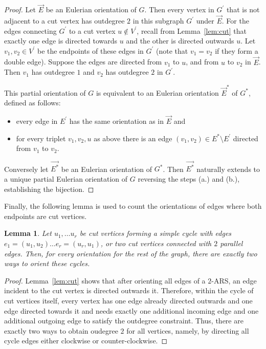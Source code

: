 \documentclass{article}
\newtheorem{lemma}{Lemma}
\begin{document}
        \begin{proof}
            Let $\vec{E}$ be an Eulerian orientation of $G$.
            Then every vertex in $G^\prime$ that is not adjacent to a cut vertex has outdegree $2$ in this subgraph $G^\prime$ under $\vec{E}$.
            For the edges connecting $G^\prime$ to a cut vertex $u \notin V^\prime$, recall from Lemma~\ref{lem:cut} that exactly one edge is directed towards $u$ and the other is directed outwards $u$.
            Let $v_1, v_2 \in V^\prime$ be the endpoints of these edges in $G^\prime$ (note that $v_1 = v_2$ if they form a double edge).
            Suppose the edges are directed from $v_1$ to $u$, and from $u$ to $v_2$ in $\vec{E}$.
            Then $v_1$ has outdegree $1$ and $v_2$ has outdegree $2$ in $G^\prime$.
        
            This partial orientation of $G$ is equivalent to an Eulerian orientation $\vec{E}^*$ of $G^*$, defined as follows:
            \begin{itemize}
                \item[a.] every edge in $E^\prime$ has the same orientation as in $\vec{E}$ and
                \item[b.] for every triplet $v_1, v_2, u$ as above there is an edge $(v_1, v_2)\in E^*\setminus E^\prime$ directed from $v_1$ to $v_2$.
            \end{itemize}

            Conversely let $\vec{E^*}$ be an Eulerian orientation of $G^*$.
            Then $\vec{E^*}$ naturally extends to a unique partial Eulerian orientation of $G$ reversing the steps (a.) and (b.), establishing the bijection.
        \end{proof}
        
        Finally, the following lemma is used to count the orientations of edges where both endpoints are cut vertices.
        \begin{lemma}\label{lem:circle}
            Let $u_1, \dots u_r$ be cut vertices forming a simple cycle with edges $e_1=(u_1,u_2) \dots e_r=(u_r,u_1)$, or two cut vertices connected with $2$ parallel edges.
            Then, for every orientation for the rest of the graph, there are exactly two ways to orient these cycles.
        \end{lemma}
        \begin{proof}
            Lemma~\ref{lem:cut} shows that after orienting all edges of a $2$-ARS, an edge incident to the cut vertex is directed outwards it.
            Therefore, within the cycle of cut vertices itself, every vertex has one edge already directed outwards and one edge directed towards it and needs exactly one additional incoming edge and one additional outgoing edge to satisfy the outdegree constraint.
            Thus, there are exactly two ways to obtain oudegree $2$ for all vertices, namely, by directing all cycle edges either clockwise or counter-clockwise. 
        \end{proof}
        
\end{document}
